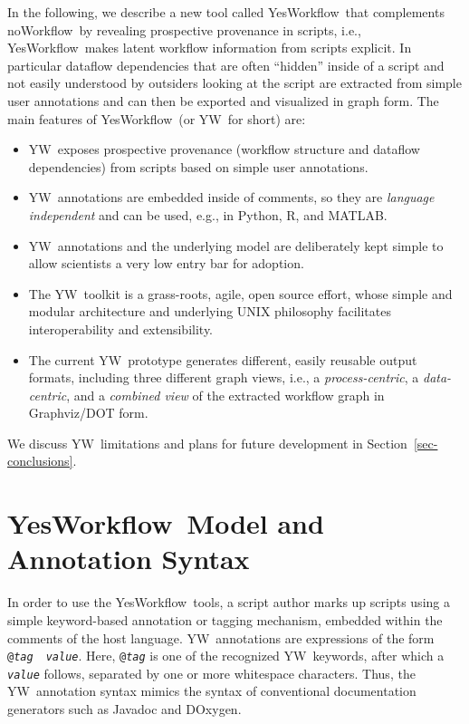 \documentclass{article}
\newcommand{\NW}{\textsf{noWorkflow}}
\newcommand{\YW}{\textsf{YesWorkflow}}
\newcommand{\yw}{\textsf{YW}}
\newcommand{\YWT}{\textsf{YesWorkflow}}
\newcommand{\ywa}[1]{\texttt{#1}}
\newcommand{\R}{\textsf{R}}
\newcommand{\MATLAB}{\textsf{MATLAB}}
\begin{document}
In the following, we describe a new tool called \YW\  that
complements \NW\ by revealing prospective provenance in
scripts, i.e., \YW\ makes latent workflow information from scripts explicit. In
particular dataflow dependencies that are often ``hidden'' inside of a
script and not easily understood by outsiders looking at the script
are extracted from simple user annotations and can then be exported
and visualized in graph form. 
The main features of \YW\ (or \yw\ for short) are:
\begin{itemize}

\item \yw\ exposes prospective provenance (workflow structure and
  dataflow dependencies) from scripts based on simple user annotations.
\item \yw\ annotations are embedded inside of comments, so they
  are \emph{language independent} and can be used, e.g., in Python, \R,
  and \MATLAB.
\item \yw\ annotations and the underlying model are deliberately kept
  simple to allow scientists a very low entry bar for adoption.

\item The \yw\ toolkit is a grass-roots, agile, open source effort, whose
 simple and modular architecture and underlying UNIX philosophy
 facilitates interoperability and extensibility.

\item The current \yw\ prototype generates different, easily reusable
  output formats, including three different graph views, i.e., a
  \emph{process-centric}, a \emph{data-centric}, and a \emph{combined
    view} of the extracted workflow graph in Graphviz/DOT form.
 \end{itemize}

 \noindent We discuss \yw\ limitations and plans for future
 development in Section~\ref{sec-conclusions}.


\section{\YWT\ Model and Annotation Syntax}\label{sec-ywmodel}

In order to use the \YW\ tools, a script author marks up scripts using
a simple keyword-based annotation or tagging mechanism, embedded
within the comments of the host language. \yw\ annotations are
expressions of the form
\ywa{@\emph{tag}}~\textvisiblespace~\ywa{\emph{value}}. Here,
\ywa{@\emph{tag}} is one of the recognized \yw\ keywords, after which a
\ywa{\emph{value}} follows, separated by one or more whitespace
characters. Thus, the \yw\ annotation syntax mimics the syntax of
conventional documentation generators such as Javadoc and DOxygen.
\end{document}
